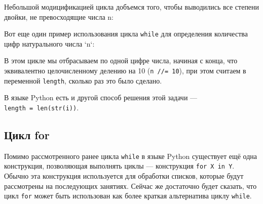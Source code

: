 \begin{Shaded}
\begin{Highlighting}[]
\OperatorTok{=} 
 
\end{Highlighting}
\end{Shaded}

Небольшой модицификацией цикла добъемся того, чтобы выводились все
степени двойки, не превосходящие числа n:

\begin{Shaded}
\begin{Highlighting}[]
\OperatorTok{=} 
 \OperatorTok{<=} 
    \OperatorTok{*=} 
\end{Highlighting}
\end{Shaded}

Вот еще один пример использования цикла \texttt{while} для определения
количества цифр натурального числа `n`:

\begin{Shaded}
\begin{Highlighting}[]
\OperatorTok{=} \NormalTok{(}\NormalTok{())}
\OperatorTok{=} 
 \OperatorTok{>} \NormalTok{:}
    \OperatorTok{+=} 
    \OperatorTok{//=} 
\end{Highlighting}
\end{Shaded}

В этом цикле мы отбрасываем по одной цифре числа, начиная с конца, что
эквивалентно целочисленному делению на 10 (\texttt{n\ //=
10}), при этом считаем в переменной \texttt{length}, сколько раз это
было сделано.

В языке Python есть и другой способ решения этой задачи ---
\texttt{length\ =\ len(str(i))}.

\subsection{Цикл for}\label{ux446ux438ux43aux43b-for}

Помимо рассмотренного ранее цикла \texttt{while} в языке Python
существует ещё одна конструкция, позволяющая выполнять циклы ---
конструкция \texttt{for\ X\ in\ Y}. Обычно эта конструкция используется
для обработки списков, которые будут рассмотрены на последующих
занятиях. Сейчас же достаточно будет сказать, что цикл \texttt{for}
может быть использован как более краткая альтернатива циклу
\texttt{while}.

